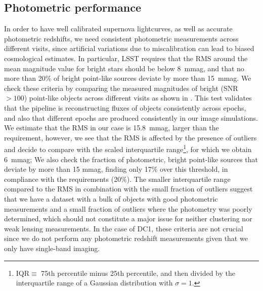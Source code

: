 \documentclass[a4paper,fleqn,usenatbib]{mnras}
\begin{document}
\subsection{Photometric performance}
\label{sssec:photometry}
In order to have well calibrated supernova lightcurves, as well as accurate photometric redshifts, we need consistent photometric measurements across different visits, since artificial variations due to miscalibration can lead to biased cosmological estimates. In particular, LSST requires that the RMS around the mean magnitude value for bright stars should be below 8~mmag, and that no more than 20\% of bright point-like sources deviate by more than 15~mmag. We check these criteria by comparing the measured magnitudes of bright (SNR $> 100$) point-like objects across different visits as shown in . This test validates that the pipeline is reconstructing fluxes of objects consistently across epochs, and also that different epochs are produced consistently in our image simulations. We estimate that the RMS in our case is 15.8~mmag, larger than the requirement, however, we see that the RMS is affected by the presence of outliers and decide to compare with the scaled interquartile range\footnote{IQR$\equiv$ 75th percentile minus 25th percentile, and then divided by the interquartile range of a Gaussian distribution with $\sigma=1$.}, for which we obtain 6~mmag; We also check the fraction of photometric, bright point-like sources that deviate by more than 15 mmag, finding only 17\% over this threshold, in compliance with the requirements (20\%). The smaller interquartile range compared to the RMS in combination with the small fraction of outliers suggest that we have a dataset with a bulk of objects with good photometric measurements and a small fraction of outliers where the photometry was poorly determined, which should not constitute a major issue for neither clustering nor weak lensing measurements. In the case of DC1, these criteria are not crucial since we do not perform any photometric redshift measurements given that we only have single-band imaging.
\end{document}
